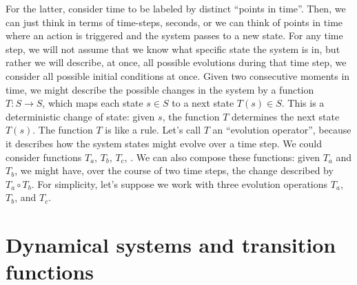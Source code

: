 %
%
For the latter, consider time to be labeled by distinct ``points in time''.
Then, we can just think in terms of time-steps, \eg  seconds, or we can think of points in time where \eg  an action is triggered and the system passes to a new state.
%
For any time step, we will not assume that we know what specific state the system is in, but rather we will describe, at once, all possible evolutions during that time step, \ie  we consider all possible initial conditions at once.
Given two consecutive moments in time, we might describe the possible changes in the system by a function $T : S \rightarrow S$, which maps each state $s \in S$ to a next state $T(s) \in S$.
This is a deterministic change of state: given $s$, the function $T$ determines the next state $T(s)$.
The function $T$ is like a rule.
Let's call $T$ an ``evolution operator'', because it describes how the system states might evolve over a time step.
%
We could consider functions $T_a$, $T_b$, $T_c$, \etc.
We can also compose these functions: given $T_a$ and $T_b$, we might have, over the course of two time steps, the change described by $T_a \circ T_b$.
For simplicity, let's suppose we work with three evolution operations $T_a$, $T_b$, and $T_c$.
%
%
%
%
%
\section{Dynamical systems and transition functions}

